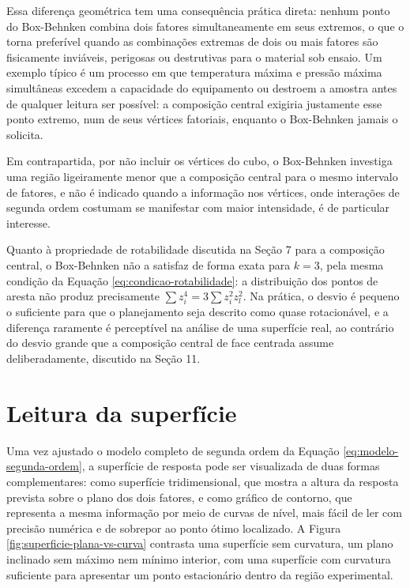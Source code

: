 \documentclass{doeapostila}
\begin{document}
Essa diferença geométrica tem uma consequência prática direta: nenhum ponto
do Box-Behnken combina dois fatores simultaneamente em seus extremos, o que
o torna preferível quando as combinações extremas de dois ou mais fatores
são fisicamente inviáveis, perigosas ou destrutivas para o material sob
ensaio. Um exemplo típico é um processo em que temperatura máxima e pressão
máxima simultâneas excedem a capacidade do equipamento ou destroem a amostra
antes de qualquer leitura ser possível: a composição central exigiria
justamente esse ponto extremo, num de seus vértices fatoriais, enquanto o
Box-Behnken jamais o solicita.

Em contrapartida, por não incluir os vértices do cubo, o Box-Behnken
investiga uma região ligeiramente menor que a composição central para o
mesmo intervalo de fatores, e não é indicado quando a informação nos
vértices, onde interações de segunda ordem costumam se manifestar com maior
intensidade, é de particular interesse.

Quanto à propriedade de rotabilidade discutida na Seção 7 para a composição
central, o Box-Behnken não a satisfaz de forma exata para $k=3$, pela
mesma condição da Equação \eqref{eq:condicao-rotabilidade}: a distribuição
dos pontos de aresta não produz precisamente $\sum z_{i}^{4} = 3\sum
z_{i}^{2}z_{l}^{2}$. Na prática, o desvio é pequeno o suficiente para que o
planejamento seja descrito como quase rotacionável, e a diferença raramente
é perceptível na análise de uma superfície real, ao contrário do desvio
grande que a composição central de face centrada assume deliberadamente,
discutido na Seção 11.

\section{Leitura da superfície}

Uma vez ajustado o modelo completo de segunda ordem da Equação
\eqref{eq:modelo-segunda-ordem}, a superfície de resposta pode ser
visualizada de duas formas complementares: como superfície tridimensional,
que mostra a altura da resposta prevista sobre o plano dos dois fatores, e
como gráfico de contorno, que representa a mesma informação por meio de
curvas de nível, mais fácil de ler com precisão numérica e de sobrepor ao
ponto ótimo localizado. A Figura \ref{fig:superficie-plana-vs-curva} contrasta
uma superfície sem curvatura, um plano inclinado sem máximo nem mínimo
interior, com uma superfície com curvatura suficiente para apresentar um
ponto estacionário dentro da região experimental.
\end{document}
